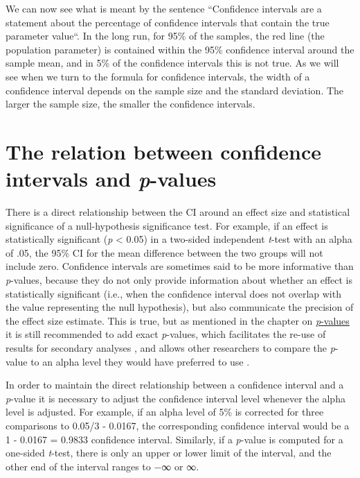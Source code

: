 \documentclass[
]{krantz}
\begin{document}
We can now see what is meant by the sentence ``Confidence intervals are a statement about the percentage of confidence intervals that contain the true parameter value``. In the long run, for 95\% of the samples, the red line (the population parameter) is contained within the 95\% confidence interval around the sample mean, and in 5\% of the confidence intervals this is not true. As we will see when we turn to the formula for confidence intervals, the width of a confidence interval depends on the sample size and the standard deviation. The larger the sample size, the smaller the confidence intervals.

\hypertarget{relatCIp}{%
\section{\texorpdfstring{The relation between confidence intervals and \emph{p}-values}{The relation between confidence intervals and p-values}}\label{relatCIp}}

There is a direct relationship between the CI around an effect size and statistical significance of a null-hypothesis significance test. For example, if an effect is statistically significant (\emph{p} \textless{} 0.05) in a two-sided independent \emph{t}-test with an alpha of .05, the 95\% CI for the mean difference between the two groups will not include zero. Confidence intervals are sometimes said to be more informative than \emph{p}-values, because they do not only provide information about whether an effect is statistically significant (i.e., when the confidence interval does not overlap with the value representing the null hypothesis), but also communicate the precision of the effect size estimate. This is true, but as mentioned in the chapter on \href{pvalue}{\emph{p}-values} it is still recommended to add exact \emph{p}-values, which facilitates the re-use of results for secondary analyses \citep{appelbaum_journal_2018}, and allows other researchers to compare the \emph{p}-value to an alpha level they would have preferred to use \citep{lehmann_testing_2005}.

In order to maintain the direct relationship between a confidence interval and a \emph{p}-value it is necessary to adjust the confidence interval level whenever the alpha level is adjusted. For example, if an alpha level of 5\% is corrected for three comparisons to 0.05/3 - 0.0167, the corresponding confidence interval would be a 1 - 0.0167 = 0.9833 confidence interval. Similarly, if a \emph{p}-value is computed for a one-sided \emph{t}-test, there is only an upper or lower limit of the interval, and the other end of the interval ranges to −∞ or ∞.
\end{document}
